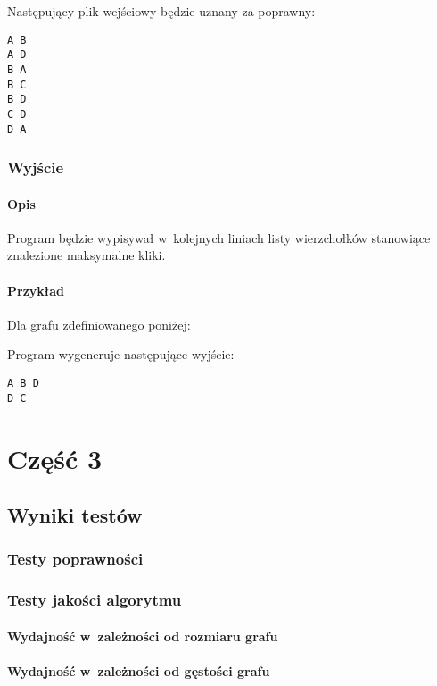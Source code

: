 \documentclass[11pt,a4paper]{article}
\begin{document}
\noindent Następujący plik wejściowy będzie uznany za poprawny:\\
\begin{lstlisting}[caption = Przykładowy plik wejściowy]
A B
A D
B A
B C
B D
C D
D A
\end{lstlisting}

\subsubsection{Wyjście}
\paragraph{Opis} Program będzie wypisywał w~kolejnych liniach listy wierzchołków stanowiące znalezione maksymalne kliki.
\paragraph{Przykład} Dla grafu zdefiniowanego poniżej:\\


\noindent Program wygeneruje następujące wyjście:\\
\begin{lstlisting}[caption = Wynik działania programu]
A B D
D C
\end{lstlisting}

\section{Część 3}
\subsection{Wyniki testów}

\subsubsection{Testy poprawności}

\subsubsection{Testy jakości algorytmu}

\paragraph{Wydajność w~zależności od rozmiaru grafu}

\paragraph{Wydajność w~zależności od gęstości grafu}
\end{document}
